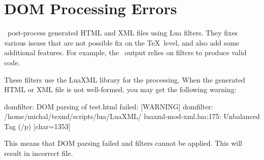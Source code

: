 \section{DOM Processing Errors}
\label{faq:dom_processing}

\texfourht\ post-process generated HTML and XML files using Lua filters. They fixes various issues that
are not possible fix on the \TeX\ level, and also add some additional features. For example, the \mathml\ 
output relies on filters to produce valid code.

These filters use the LuaXML library for the processing. When the generated HTML or XML file is not well-formed,
you may get the following warning:


\begin{shellcommand}
[WARNING] domfilter: DOM parsing of test.html failed:
[WARNING] domfilter: /home/michal/texmf/scripts/lua/LuaXML/
luaxml-mod-xml.lua:175: Unbalanced Tag (/p) [char=1353]
\end{shellcommand}

This means that DOM parsing failed and filters cannot be applied. This will result in incorrect file.

